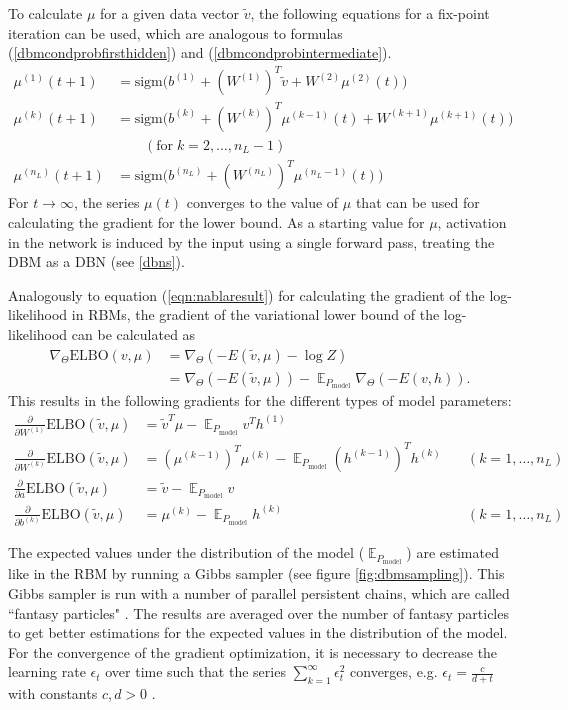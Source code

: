 \documentclass[12pt]{article}
\newcommand{\sigm}{\mathrm{sigm}}
\newcommand{\ELBO}{\mathrm{ELBO}}
\DeclareMathOperator{\EX}{\mathbb{E}}
\begin{document}
To calculate $\mu$ for a given data vector $\tilde{v}$, the following equations for a fix-point iteration can be used, which are analogous to formulas (\ref{dbmcondprobfirsthidden}) and (\ref{dbmcondprobintermediate}).
\begin{align*}
\mu^{(1)}(t+1)&= \sigm \bigg( b^{(1)} + (W^{(1)})^T \tilde{v} + W^{(2)} \mu ^{(2)}(t) \bigg) \\
\mu^{(k)}(t+1) &= \sigm \bigg( b^{(k)} + (W^{(k)})^T \mu^{(k-1)}(t) + W^{(k+1)} \mu^{(k+1)}(t) \bigg) \\ 
&\quad\quad (\text{for} \; k=2,\dots, n_L-1) \\
\mu^{(n_L)}(t+1)&= \sigm \bigg( b^{(n_L)} + (W^{(n_L)})^T \mu^{(n_L-1)}(t) \bigg)
\end{align*}
For  $t \rightarrow \infty$, the series $\mu(t)$ converges to the value of $\mu$ that can be used for calculating the gradient for the lower bound.
As a starting value for $\mu$, activation in the network is induced by the input using a single forward pass, treating the DBM as a DBN (see \ref{dbns}).

Analogously to equation (\ref{eqn:nablaresult}) for calculating the gradient of the log-likelihood in RBMs, the gradient of the variational lower bound of the log-likelihood can be calculated as 
\begin{align*}
\nabla_{\Theta} \ELBO(v, \mu) &= \nabla_{\Theta} ( - E(\tilde{v}, \mu) - \log Z ) \\
 &= \nabla_{\Theta} (- E(\tilde{v}, \mu)) - \EX_{P_\text{model}} \nabla_{\Theta} (-E(v, h)).
\end{align*}
This results in the following gradients for the different types of model parameters:
\begin{align*}
\frac{\partial}{\partial W^{(1)}} \ELBO(\tilde{v}, \mu) &= \widetilde{v}^T \mu - \EX_{P_\text{model}} v^T h^{(1)} \\
\frac{\partial}{\partial W^{(k)}} \ELBO(\tilde{v}, \mu) &= (\mu^{(k-1)})^T \mu^{(k)}  - \EX_{P_\text{model}} (h^{(k-1)})^T h^{(k)} &\quad(k = 1, \dots, n_L)\\
\frac{\partial}{\partial a}  \ELBO(\tilde{v}, \mu) &=  \widetilde{v} - \EX_{P_\text{model}}  v \\
\frac{\partial}{\partial b^{(k)}}  \ELBO(\tilde{v}, \mu) &=  \mu^{(k)} - \EX_{P_\text{model}} h^{(k)}  &\quad ( k = 1, \dots, n_L)
\end{align*}

The expected values under the distribution of the model ($\EX_{P_\text{model}}$) are estimated like in the RBM by running a Gibbs sampler (see figure \ref{fig:dbmsampling}).
This Gibbs sampler is run with a number of parallel persistent chains, which are called ``fantasy particles" \citep{salakhutdinov2009DBMs}. The results are averaged over the number of fantasy particles to get better estimations for the expected values in the distribution of the model.
For the convergence of the gradient optimization, it is necessary to decrease the learning rate $\epsilon_t$ over time such that the series $\sum_{k=1}^\infty \epsilon_t^2$ converges, e.g. $\epsilon_t = \frac{c}{d+t}$ with constants $c, d > 0$ \citep{sala2012anefficient}.
\end{document}
